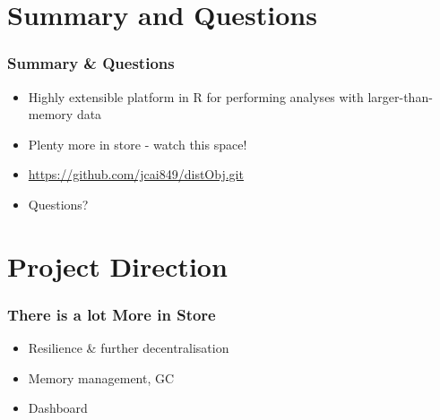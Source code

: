\documentclass[handout]{beamer}
\begin{document}
\section{Summary and Questions}
	\begin{frame}
		\frametitle{Summary \& Questions}
		\begin{itemize}
			\item Highly extensible platform in R for performing
				analyses with larger-than-memory data
			\item Plenty more in store - watch this space!
			\item \url{https://github.com/jcai849/distObj.git}
			\item Questions?
		\end{itemize}
	\end{frame}
\section{Project Direction}
	\begin{frame}
		\frametitle{There is a lot More in Store}
		\begin{itemize}
			\item Resilience \& further decentralisation
			\item Memory management, GC
			\item Dashboard
		\end{itemize}
	\end{frame}
\end{document}
